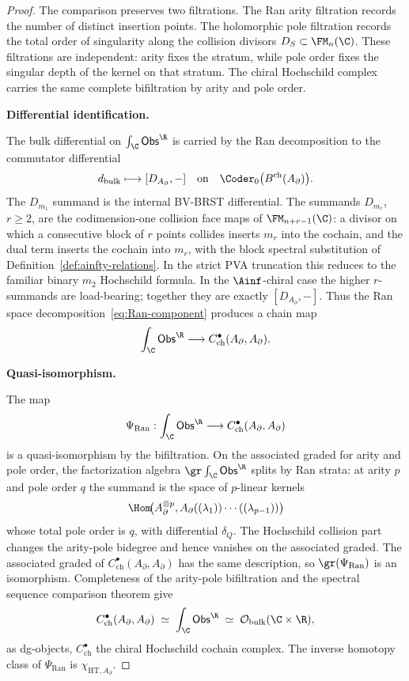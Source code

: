 \begin{proof}
The comparison preserves two filtrations. The Ran arity filtration
records the number of distinct insertion points. The holomorphic pole
filtration records the total order of singularity along the collision
divisors \(D_S\subset \FM_n(\C)\). These filtrations are independent:
arity fixes the stratum, while pole order fixes the singular depth of
the kernel on that stratum. The chiral Hochschild complex carries the
same complete bifiltration by arity and pole order.

\medskip
\textbf{Differential identification.}

The bulk differential on \(\int_{\C}\mathsf{Obs}^{\R}\) is carried by
the Ran decomposition to the commutator differential
\[
d_{\mathrm{bulk}}
\longmapsto
[D_{A_\partial},-]
\quad\text{on}\quad
\Coder_0\bigl(B^{\mathrm{ch}}(A_\partial)\bigr).
\]
The \(D_{m_1}\) summand is the internal BV-BRST differential.  The
summands \(D_{m_r}\), \(r\ge2\), are the codimension-one collision
face maps of \(\FM_{n+r-1}(\C)\): a divisor on which a consecutive
block of \(r\) points collides inserts \(m_r\) into the cochain, and
the dual term inserts the cochain into \(m_r\), with the block spectral
substitution of Definition~\ref{def:ainfty-relations}.  In the strict
PVA truncation this reduces to the familiar binary \(m_2\) Hochschild
formula.  In the \(\Ainf\)-chiral case the higher \(r\)-summands are
load-bearing; together they are exactly \([D_{A_\partial},-]\).
Thus the Ran space decomposition~\eqref{eq:Ran-component} produces a
chain map
\[
\int_{\C}\mathsf{Obs}^{\R}
\longrightarrow
C^\bullet_{\mathrm{ch}}(A_{\partial}, A_{\partial}).
\]

\medskip
\textbf{Quasi-isomorphism.}

The map
\begin{equation}
\Psi_{\mathrm{Ran}} :
\int_{\C} \mathsf{Obs}^{\R}
\longrightarrow
C^\bullet_{\mathrm{ch}}(A_{\partial}, A_{\partial})
\end{equation}
is a quasi-isomorphism by the bifiltration. On the associated graded
for arity and pole order, the factorization algebra
\(\gr\int_{\C}\mathsf{Obs}^{\R}\) splits by Ran strata: at arity \(p\)
and pole order \(q\) the summand is the space of \(p\)-linear kernels
\[
\Hom\!\bigl(A_{\partial}^{\otimes p},
A_{\partial}((\lambda_1))\cdots((\lambda_{p-1}))\bigr)
\]
whose total pole order is \(q\), with differential \(\delta_Q\). The
Hochschild collision part changes the arity-pole bidegree and hence
vanishes on the associated graded. The associated graded of
\(C^\bullet_{\mathrm{ch}}(A_{\partial},A_{\partial})\) has the same
description, so \(\gr(\Psi_{\mathrm{Ran}})\) is an isomorphism.
Completeness of the
arity-pole bifiltration and the spectral sequence comparison theorem
give
\begin{equation}
C^\bullet_{\mathrm{ch}}(A_{\partial}, A_{\partial}) \;\simeq\; \int_{\C} \mathsf{Obs}^{\R} \;\simeq\; \mathcal{O}_{\mathrm{bulk}}(\C \times \R),
\end{equation}
as dg-objects, $C^\bullet_{\mathrm{ch}}$ the chiral Hochschild
cochain complex. The inverse homotopy class of
\(\Psi_{\mathrm{Ran}}\) is \(\chi_{\mathrm{HT},A_\partial}\).
\end{proof}

